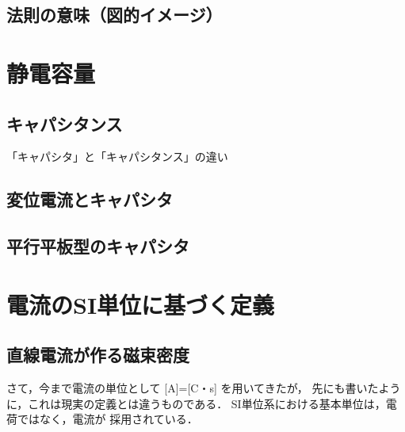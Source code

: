     \subsection{法則の意味（図的イメージ）}

    \section{静電容量}
    \subsection{キャパシタンス}

    \begin{memo}{「キャパシタ」と「キャパシタンス」の違い}
    \end{memo}

    \subsection{変位電流とキャパシタ}

    \subsection{平行平板型のキャパシタ}

    \section{電流のSI単位に基づく定義}
    \subsection{直線電流が作る磁束密度}
        さて，今まで電流の単位として [A]=[C・s] を用いてきたが，
        先にも書いたように，これは現実の定義とは違うものである．
        SI単位系における基本単位は，電荷ではなく，電流が
        採用されている．

